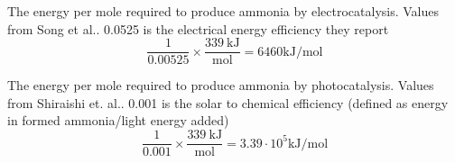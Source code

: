 \documentclass[journal=jacsat,manuscript=article]{achemso}
\begin{document}
The energy per mole required to produce ammonia by electrocatalysis. Values from Song et al.\cite{Song_2018}. 0.0525 is the electrical energy efficiency they report
\begin{equation}
\mathrm{\frac{1}{0.00525} \times \frac{339 \: kJ}{mol} = 6460 kJ/mol
}
\end{equation}

The energy per mole required to produce ammonia by photocatalysis. Values from Shiraishi et. al.\cite{Shiraishi_2018}. 0.001 is the solar to chemical efficiency (defined as energy in formed ammonia/light energy added)
\begin{equation}
\mathrm{\frac{1}{0.001} \times \frac{339 \: kJ}{mol} = 3.39 \cdot 10^5 kJ/mol
}

\end{equation}


\pagebreak

\end{document}
